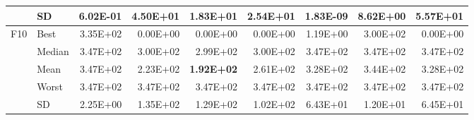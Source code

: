 \documentclass[algorithms,article,submit,moreauthors,pdftex]{Definitions/mdpi}
\newcommand{\bestval}[1]{\textbf{#1}}
\begin{document}
\begin{table}[p]
{\begin{tabular}{llrrrrrrr}
 & SD & 6.02E-01 & 4.50E+01 & 1.83E+01 & 2.54E+01 & 1.83E-09 & 8.62E+00 & 5.57E+01 \\
\midrule
F10 & Best & 3.35E+02 & 0.00E+00 & 0.00E+00 & 0.00E+00 & 1.19E+00 & 3.00E+02 & 0.00E+00 \\
 & Median & 3.47E+02 & 3.00E+02 & 2.99E+02 & 3.00E+02 & 3.47E+02 & 3.47E+02 & 3.47E+02 \\
 & Mean & 3.47E+02 & 2.23E+02 & \bestval{1.92E+02} & 2.61E+02 & 3.28E+02 & 3.44E+02 & 3.28E+02 \\
 & Worst & 3.47E+02 & 3.47E+02 & 3.47E+02 & 3.47E+02 & 3.47E+02 & 3.47E+02 & 3.47E+02 \\
 & SD & 2.25E+00 & 1.35E+02 & 1.29E+02 & 1.02E+02 & 6.43E+01 & 1.20E+01 & 6.45E+01 \\
\bottomrule
\end{tabular}}
\end{table}
\end{document}
